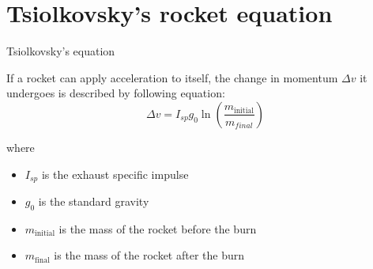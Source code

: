 \documentclass{beamer}
\begin{document}
\section{Tsiolkovsky's rocket equation}
\begin{frame}{Tsiolkovsky's equation}
    \begin{definition}
    If a rocket can apply acceleration to itself, the change in momentum $\Delta v$ it undergoes is described by following equation:
        \begin{equation}
            \Delta v = I_{sp} g_0 \ln \left( \frac{m_{\text{initial}}}{m_{final}} \right)
        \end{equation}  
    \end{definition}
    where
        \begin{itemize}
            \item {} $I_{sp}$ is the exhaust specific impulse
            \item {} $g_0$ is the standard gravity
            \item {} $m_{\text{initial}}$ is the mass of the rocket before the burn
            \item {} $m_{\text{final}}$ is the mass of the rocket after the burn
        \end{itemize}
\end{frame} 
\end{document}
